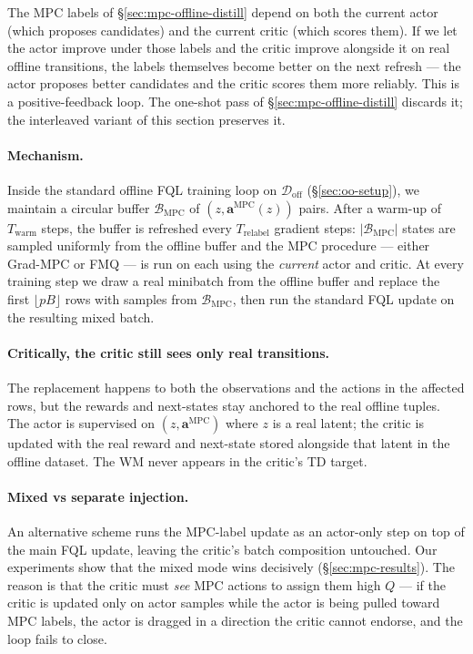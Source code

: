 The MPC labels of \S\ref{sec:mpc-offline-distill} depend on both the current actor (which proposes candidates) and the current critic (which scores them). If we let the actor improve under those labels and the critic improve alongside it on real offline transitions, the labels themselves become better on the next refresh --- the actor proposes better candidates and the critic scores them more reliably. This is a positive-feedback loop. The one-shot pass of \S\ref{sec:mpc-offline-distill} discards it; the interleaved variant of this section preserves it.

\paragraph{Mechanism.} Inside the standard offline FQL training loop on $\mathcal{D}_{\text{off}}$ (\S\ref{sec:oo-setup}), we maintain a circular buffer $\mathcal{B}_{\text{MPC}}$ of $(z, \mathbf{a}^{\text{MPC}}(z))$ pairs. After a warm-up of $T_{\text{warm}}$ steps, the buffer is refreshed every $T_{\text{relabel}}$ gradient steps: $|\mathcal{B}_{\text{MPC}}|$ states are sampled uniformly from the offline buffer and the MPC procedure --- either Grad-MPC or FMQ --- is run on each using the \emph{current} actor and critic. At every training step we draw a real minibatch from the offline buffer and replace the first $\lfloor pB \rfloor$ rows with samples from $\mathcal{B}_{\text{MPC}}$, then run the standard FQL update on the resulting mixed batch.

\paragraph{Critically, the critic still sees only real transitions.} The replacement happens to both the observations and the actions in the affected rows, but the rewards and next-states stay anchored to the real offline tuples. The actor is supervised on $(z, \mathbf{a}^{\text{MPC}})$ where $z$ is a real latent; the critic is updated with the real reward and next-state stored alongside that latent in the offline dataset. The WM never appears in the critic's TD target.

\paragraph{Mixed vs separate injection.} An alternative scheme runs the MPC-label update as an actor-only step on top of the main FQL update, leaving the critic's batch composition untouched. Our experiments show that the mixed mode wins decisively (\S\ref{sec:mpc-results}). The reason is that the critic must \emph{see} MPC actions to assign them high $Q$ --- if the critic is updated only on actor samples while the actor is being pulled toward MPC labels, the actor is dragged in a direction the critic cannot endorse, and the loop fails to close.


